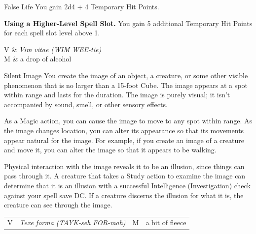 \begin{Spell}[
  level={1st},
  time={1 action},
  range={Self},
  components={V, S, M},
  duration={Instantaneous},
  school={Necromancy},
  attack={None},
  effect={Buff}
]{False Life}
You gain 2d4 + 4 Temporary Hit Points.

\textbf{Using a Higher-Level Spell Slot.} You gain 5 additional Temporary Hit Points for each spell slot level above 1.

\begin{components}
V & \textit{Vim vitae (WIM WEE-tie)} \\
M & a drop of alcohol
\end{components}
\end{Spell}


\begin{Spell}[
  tags=Concentration,
  level={1st},
  time={1 action},
  range={60 ft/15 ft cube},
  components={V, S, M},
  duration={10 minutes},
  school={Illusion},
  attack={None},
  effect={Control}
]{Silent Image}
You create the image of an object, a creature, or some other visible phenomenon that is no larger than a 15-foot Cube. The image appears at a spot within range and lasts for the duration. The image is purely visual; it isn't accompanied by sound, smell, or other sensory effects.

As a Magic action, you can cause the image to move to any spot within range. As the image changes location, you can alter its appearance so that its movements appear natural for the image. For example, if you create an image of a creature and move it, you can alter the image so that it appears to be walking.

Physical interaction with the image reveals it to be an illusion, since things can pass through it. A creature that takes a Study action to examine the image can determine that it is an illusion with a successful Intelligence (Investigation) check against your spell save DC. If a creature discerns the illusion for what it is, the creature can see through the image.

\vfill
\begin{tabular}{lrlr}
V & \textit{Texe forma (TAYK-seh FOR-mah)} & M & a bit of fleece
\end{tabular}
\end{Spell}


